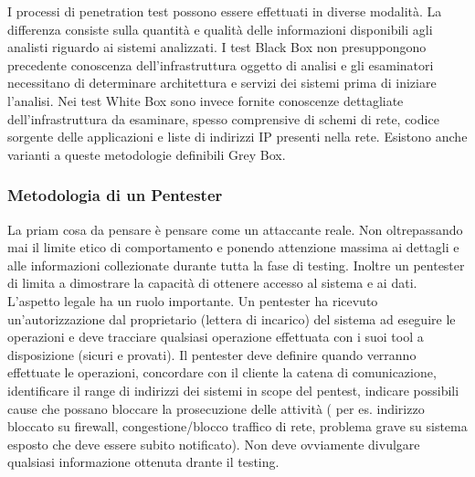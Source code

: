 I processi di penetration test possono essere effettuati in diverse modalità. La differenza consiste sulla quantità e qualità delle informazioni disponibili agli analisti riguardo ai sistemi analizzati. I test Black Box non presuppongono precedente conoscenza dell'infrastruttura oggetto di analisi e gli esaminatori necessitano di determinare architettura e servizi dei sistemi prima di iniziare l'analisi. Nei test White Box sono invece fornite conoscenze dettagliate dell'infrastruttura da esaminare, spesso comprensive di schemi di rete, codice sorgente delle applicazioni e liste di indirizzi IP presenti nella rete. Esistono anche varianti a queste metodologie definibili Grey Box.

\subsubsection{Metodologia di un Pentester}
La priam cosa da pensare è pensare come un attaccante reale. Non oltrepassando mai il limite etico di comportamento e ponendo attenzione massima ai dettagli e alle informazioni collezionate durante tutta la fase di testing. Inoltre un pentester di limita a dimostrare la capacità di ottenere accesso al sistema e ai dati.  L'aspetto legale ha un ruolo importante. Un pentester ha ricevuto un'autorizzazione dal proprietario (lettera di incarico) del sistema ad eseguire le operazioni e deve tracciare qualsiasi operazione effettuata con i suoi tool a disposizione (sicuri e provati). Il pentester deve definire quando verranno effettuate le operazioni, concordare con il cliente la catena di comunicazione, identificare il range di indirizzi dei sistemi in scope del pentest,  indicare possibili cause che possano bloccare la prosecuzione delle attività ( per es. indirizzo bloccato su firewall, congestione/blocco traffico di rete, problema grave su sistema esposto che deve essere subito
notificato). Non deve ovviamente divulgare qualsiasi informazione ottenuta drante il testing. 

